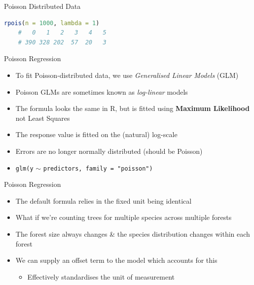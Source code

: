 \documentclass[aspectratio=169,11pt]{beamer}
\begin{document}
\begin{frame}[fragile]{Poisson Distributed Data}
	
	\begin{lstlisting}[language=R]
	rpois(n = 1000, lambda = 1)
	#   0   1   2   3   4   5 
	# 390 328 202  57  20   3 
	\end{lstlisting}

\end{frame}

\begin{frame}{Poisson Regression}

	\begin{itemize}
		\item To fit Poisson-distributed data, we use \textit{Generalised Linear Models} (GLM)
		\item Poisson GLMs are sometimes known as \textit{log-linear} models
		\item The formula looks the same in R, but is fitted using \textbf{Maximum Likelihood} not Least Squares
		\item The response value is fitted on the (natural) log-scale 
		\item Errors are no longer normally distributed (should be Poisson)
		\item \texttt{glm(y} $\sim$ \texttt{predictors, family = "poisson")}
	\end{itemize}

\end{frame}

\begin{frame}{Poisson Regression}

	\begin{itemize}
		\item The default formula relies in the fixed unit being identical
		\item What if we're counting trees for multiple species across multiple forests
		\item The forest size always changes \& the species distribution changes within each forest
		\item We can supply an offset term to the model which accounts for this
		\begin{itemize}
			\item Effectively standardises the unit of measurement
		\end{itemize}
	\end{itemize}

\end{frame}
\end{document}
